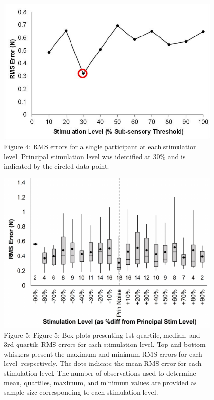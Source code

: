 \documentclass[]{cik}%
\begin{document}
\begin{figure}

{\centering \includegraphics[width=1\textwidth,height=\textheight]{./figures/fig4.pdf}

}

\caption{\label{fig-4}Figure 4: RMS errors for a single participant at
each stimulation level. Principal stimulation level was identified at
30\% and is indicated by the circled data point.}

\end{figure}

\begin{figure}

{\centering \includegraphics[width=1\textwidth,height=\textheight]{./figures/fig5.pdf}

}

\caption{\label{fig-5}Figure 5: Figure 5: Box plots presenting 1st
quartile, median, and 3rd quartile RMS errors for each stimulation
level. Top and bottom whiskers present the maximum and minimum RMS
errors for each level, respectively. The dots indicate the mean RMS
error for each stimulation level. The number of observations used to
determine mean, quartiles, maximum, and minimum values are provided as
sample size corresponding to each stimulation level.}

\end{figure}
\end{document}
